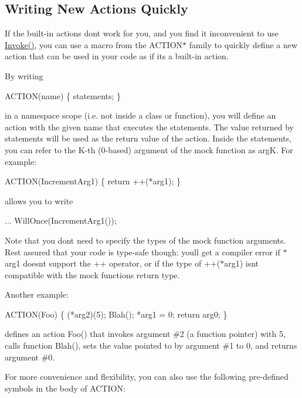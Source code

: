 \subsection*{Writing New Actions Quickly}

If the built-\/in actions don\textquotesingle{}t work for you, and you find it inconvenient to use {\ttfamily \hyperlink{namespacetesting_a12aebaf8363d49a383047529f798b694}{Invoke()}}, you can use a macro from the {\ttfamily A\+C\+T\+I\+O\+N$\ast$} family to quickly define a new action that can be used in your code as if it\textquotesingle{}s a built-\/in action.

By writing 
\begin{DoxyCode}
ACTION(name) \{ statements; \}
\end{DoxyCode}
 in a namespace scope (i.\+e. not inside a class or function), you will define an action with the given name that executes the statements. The value returned by {\ttfamily statements} will be used as the return value of the action. Inside the statements, you can refer to the K-\/th (0-\/based) argument of the mock function as {\ttfamily argK}. For example\+: 
\begin{DoxyCode}
ACTION(IncrementArg1) \{ return ++(*arg1); \}
\end{DoxyCode}
 allows you to write 
\begin{DoxyCode}
... WillOnce(IncrementArg1());
\end{DoxyCode}


Note that you don\textquotesingle{}t need to specify the types of the mock function arguments. Rest assured that your code is type-\/safe though\+: you\textquotesingle{}ll get a compiler error if {\ttfamily $\ast$arg1} doesn\textquotesingle{}t support the {\ttfamily ++} operator, or if the type of {\ttfamily ++($\ast$arg1)} isn\textquotesingle{}t compatible with the mock function\textquotesingle{}s return type.

Another example\+: 
\begin{DoxyCode}
ACTION(Foo) \{
  (*arg2)(5);
  Blah();
  *arg1 = 0;
  return arg0;
\}
\end{DoxyCode}
 defines an action {\ttfamily Foo()} that invokes argument \#2 (a function pointer) with 5, calls function {\ttfamily Blah()}, sets the value pointed to by argument \#1 to 0, and returns argument \#0.

For more convenience and flexibility, you can also use the following pre-\/defined symbols in the body of {\ttfamily A\+C\+T\+I\+ON}\+:

